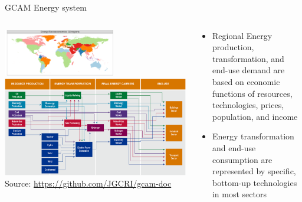 \begin{frame}{GCAM Energy system}
    \begin{columns}[T] 
        \begin{column}{0.60\textwidth} 
            \centering
            \includegraphics[width=0.6\textwidth]{extraFigs/GCAM_energy_system_breakout.png}
            \includegraphics[width=\textwidth]{extraFigs/GCAM_energy_system.png}
            \vfill\hfill \tiny{Source: \url{https://github.com/JGCRI/gcam-doc}}
        \end{column}
        \begin{column}{0.38\textwidth}
            \begin{itemize}
                \item Regional Energy production, transformation, and end-use demand are based on economic functions of resources, technologies, prices, population, and income
                \item Energy transformation and end-use consumption are represented by specific, bottom-up technologies in most sectors
            \end{itemize}
        \end{column}
    \end{columns}
\end{frame}

